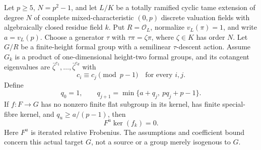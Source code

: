 \begin{lemma}
\label{lem:B-RD64-weighted-kernel}
Let $p\ge5$, $N=p^2-1$, and let $L/K$ be a totally ramified
cyclic tame extension of degree $N$ of complete mixed-characteristic
$(0,p)$ discrete valuation fields with algebraically closed residue
field $k$. Put $R=\mathcal O_L$, normalize $v_L(\pi)=1$, and
write $a=v_L(p)$. Choose a generator $\tau$ with
$\tau\pi=\zeta\pi$, where $\zeta\in K$ has order $N$.
Let $G/R$ be a finite-height formal group with a semilinear
$\tau$-descent action. Assume $G_k$ is a product of one-dimensional
height-two formal groups, and its cotangent eigenvalues are
$\bar\zeta^{c_1},\ldots,\bar\zeta^{c_d}$ with
\[
                       c_i\equiv c_j\pmod{p-1}
                       \quad\text{for every }i,j.      \tag{B-RD64.1}
\]
Define
\[
 q_0=1,\qquad q_{j+1}=\min\{a+q_j,\ p q_j+p-1\}.
                                                               \tag{B-RD64.2}
\]
If $f:F\to G$ has no nonzero finite flat subgroup in its kernel,
has finite special-fibre kernel, and $q_u\ge a/(p-1)$, then
\[
                         F^u\ker(f_k)=0.              \tag{B-RD64.3}
\]
Here $F^u$ is iterated relative Frobenius. The assumptions and
coefficient bound concern this actual target $G$, not a source
or a group merely isogenous to $G$.
\end{lemma}
